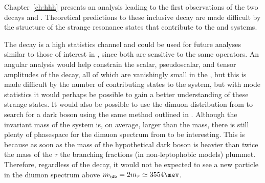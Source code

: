 








Chapter~\ref{ch:hhh} presents an analysis leading to the first observations of the two decays
\btokpipimumu and \btophikmumu.
Theoretical predictions to these inclusive decay are made difficult by the structure of the strange
resonance states that contribute to the \kpipi and \phik systems.

The decay \btokpipimumu is a high statistics channel and could be used for future analyses similar to
those of interest in \btokstrmumu, since both are sensitive to the same operators.
An angular analysis would help constrain the scalar, pseudoscalar, and tensor amplitudes of the
decay, all of which are vanishingly small in the \sm, but this is made difficult by the number of
contributing states to the \kpipi system,
but with mode statistics it would perhaps be possible to gain a better understanding of these
strange states.
It would also be possible to use the dimuon distribution from \btokpipimumu to search for a dark
boson using the same method outlined in .
Although the invariant mass of the \kpipi system is, on average, larger than the \Kstarz mass,
there is still plenty of phasespace for the dimuon spectrum from \btokpipimumu to be interesting.
This is because as soon as the mass of the hypothetical dark boson is heavier than twice the mass
of the $\tau$ the branching fractions (in non-leptophobic models) plummet.
Therefore, regardless of the decay, it would not be expected to see a new particle in the diumon
spectrum above $m_\db=2m_\tau\simeq3554\mev$.

